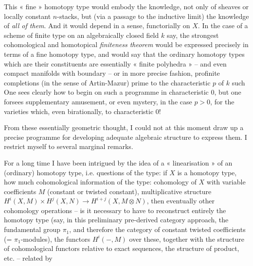 \documentclass[11pt,a4paper]{article}
\begin{document}
This « fine » homotopy type would embody the knowledge, not only of sheaves or locally constant $n$-stacks, but (via a passage to the inductive limit) the knowledge of \emph{all of them}. And it would depend\add{,} in a   sense, functorially on $X$. In the case of a scheme of finite type on an algebraically closed field $k$ say, the strongest cohomological and homotopical \emph{finiteness theorem} would be expressed precisely in terms of a fine homotopy type, and would say that the ordinary homotopy types which are their constituents are essentially « finite polyhedra » -- and even compact manifolds with boundary -- or in more precise fashion,   \struck{\ill{}} profinite completions (in the sense of Artin-Mazur) prime to the characteristic $p$ of $k$   such   One sees clearly how to begin on such a programme in characteristic $0$, but one forsees supplementary amusement, or even  mystery, in the case $p > 0$, for the varieties which, even birationally,     to characteristic $0$!

From these essentially geometric thought, I could not at this moment draw up a precise programme for developing  adequate algebraic structure to express them. I restrict myself to several marginal remarks.

For a long time I have been intrigued by the idea of a « linearisation » of an (ordinary) homotopy type, i.e. questions of the type: if $X$ is a homotopy type, how much cohomological information of the type: cohomology of $X$ with variable coefficients $M$ (constant or twisted constant), multiplicative structure $H^i(X, M) \times H^j(X, N) \to H^{i+j}(X, M \otimes N)$, then eventually other cohomology operations -- is it necessary to have to reconstruct entirely the homotopy type (say, in this preliminary pre-derived category approach,   the fundamental group $\pi_1$, and therefore the category of constant twisted coefficients (= $\pi_1$-modules), the functors $H^i(-, M)$ over these, together with the structure of cohomological functors relative to exact sequences, the structure of product, etc. -- related by
\end{document}
